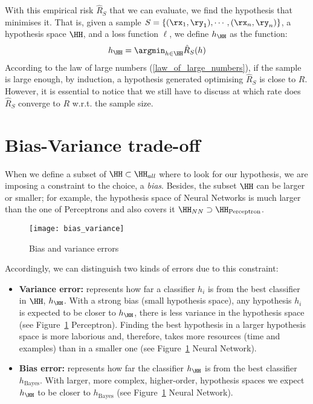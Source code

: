 With this empirical risk \(\hat{R}_{S}\) that we can evaluate, we find the hypothesis that minimises it. That is, given a sample \(S = \{(\rx_1,\ry_1),\cdots,(\rx_n, \ry_n)\}\), a hypothesis space \(\HH\), and a loss function \(\ell\), we define \(h_{\HH}\) as the function:
\begin{align}
	h_{\HH} = \argmin_{h\in \HH} \hat{R}_{S}(h)
\end{align}
According to the law of large numbers (\cref{law_of_large_numbers}), if the sample is large enough, by induction, a hypothesis generated optimising \(\hat{R}_{S}\) is close to \(R\). However, it is essential to notice that we still have to discuss at which rate does \(\hat{R}_{S}\) converge to \(R\) w.r.t. the sample size.


\section{Bias-Variance trade-off}\label{sec:bias-variance}
When we define a subset of \(\HH \subset \HH_{all}\) where to look for our hypothesis, we are imposing a constraint to the choice, a \emph{bias}. Besides, the subset \(\HH\) can be larger or smaller; for example, the hypothesis space of Neural Networks is much larger than the one of Perceptrons and also covers it \(\HH_{NN} \supset \HH_{\text{Perceptron}}\).
\begin{figure}
	[ht] \centering
	\texttt{[image: bias\_variance]}
	\caption{Bias and variance errors}\label{fig:bias-variance} \end{figure}
Accordingly, we can distinguish two kinds of errors due to this constraint:
\begin{itemize}
	\item \textbf{Variance error:} represents how far a classifier \(h_i\) is from the best classifier in \(\HH\), \(h_\HH\). With a strong bias (small hypothesis space), any hypothesis \(h_i\) is expected to be closer to \(h_\HH\), there is less variance in the hypothesis space (see Figure~\ref{fig:bias-variance} Perceptron). Finding the best hypothesis in a larger hypothesis space is more laborious and, therefore, takes more resources (time and examples) than in a smaller one (see Figure~\ref{fig:bias-variance} Neural Network).
	\item \textbf{Bias error:} represents how far the classifier \(h_\HH\) is from the best classifier \(h_{\text{Bayes}}\). With larger, more complex, higher-order, hypothesis spaces we expect \(h_\HH\) to be closer to \(h_{\text{Bayes}}\) (see Figure~\ref{fig:bias-variance} Neural Network).
\end{itemize}
